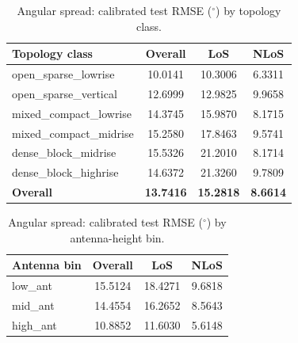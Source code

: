 \documentclass[11pt,a4paper]{article}
\begin{document}
\begin{table}[H]
\centering
\caption{Angular spread: calibrated test RMSE ($^\circ$) by topology class.}
\label{tab:as_topo}
\begin{tabular}{lccc}
\toprule
Topology class & Overall & LoS & NLoS \\
\midrule
open\_sparse\_lowrise      & 10.0141 & 10.3006 & 6.3311 \\
open\_sparse\_vertical     & 12.6999 & 12.9825 & 9.9658 \\
mixed\_compact\_lowrise    & 14.3745 & 15.9870 & 8.1715 \\
mixed\_compact\_midrise    & 15.2580 & 17.8463 & 9.5741 \\
dense\_block\_midrise      & 15.5326 & 21.2010 & 8.1714 \\
dense\_block\_highrise     & 14.6372 & 21.3260 & 9.7809 \\
\midrule
\textbf{Overall}           & \textbf{13.7416} & \textbf{15.2818} & \textbf{8.6614} \\
\bottomrule
\end{tabular}
\end{table}

\begin{table}[H]
\centering
\caption{Angular spread: calibrated test RMSE ($^\circ$) by antenna-height bin.}
\label{tab:as_ant}
\begin{tabular}{lccc}
\toprule
Antenna bin & Overall & LoS & NLoS \\
\midrule
low\_ant  & 15.5124 & 18.4271 & 9.6818 \\
mid\_ant  & 14.4554 & 16.2652 & 8.5643 \\
high\_ant & 10.8852 & 11.6030 & 5.6148 \\
\bottomrule
\end{tabular}
\end{table}
\end{document}
